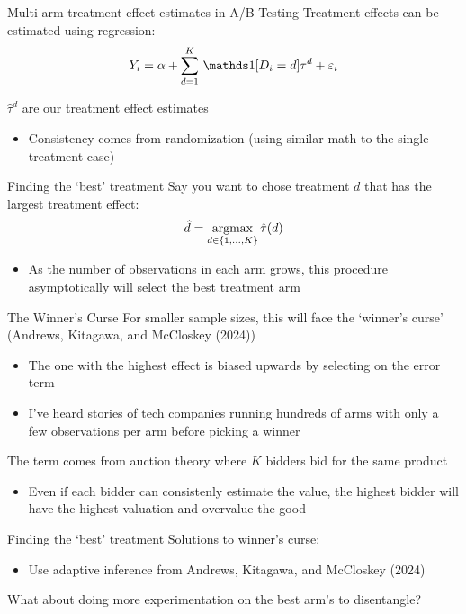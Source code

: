 \documentclass[aspectratio=169,t,11pt,table]{beamer}
\begin{document}
\begin{frame}{Multi-arm treatment effect estimates in A/B Testing}
	Treatment effects can be estimated using regression:
	$$
		Y_i = \alpha + \sum_{d = 1}^K \one{D_i = d} \tau^d + \varepsilon_i
	$$

	$\hat{\tau}^d$ are our treatment effect estimates
	\begin{itemize}
		\item Consistency comes from randomization (using similar math to the single treatment case)
	\end{itemize}
\end{frame}

\begin{frame}{Finding the `best' treatment}
	Say you want to chose treatment $d$ that has the largest treatment effect:
	$$
		\hat{d} = \operatorname*{argmax}_{d \in \{1, \dots, K\}} \hat{\tau}(d)
	$$
	\begin{itemize}
		\item As the number of observations in each arm grows, this procedure asymptotically will select the best treatment arm
	\end{itemize}
\end{frame}

\begin{frame}{The Winner's Curse}
	For smaller sample sizes, this will face the `winner's curse' (Andrews, Kitagawa, and McCloskey (2024))
	\begin{itemize}
		\item The one with the highest effect is biased upwards by selecting on the error term
		\pause
		\item I've heard stories of tech companies running hundreds of arms with only a few observations per arm before picking a winner
	\end{itemize}

	\pause
	\bigskip
	The term comes from auction theory where $K$ bidders bid for the same product
	\begin{itemize}
		\item Even if each bidder can consistenly estimate the value, the highest bidder will have the highest valuation and overvalue the good
	\end{itemize}
\end{frame}

\begin{frame}{Finding the `best' treatment}
	Solutions to winner's curse:
	\begin{itemize}
		\item Use adaptive inference from Andrews, Kitagawa, and McCloskey (2024)
	\end{itemize}

	\bigskip
	What about doing more experimentation on the best arm's to disentangle?
\end{frame}
\end{document}
